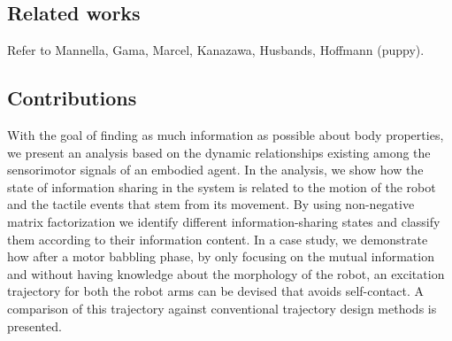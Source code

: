 
\subsection{Related works}

Refer to Mannella, Gama, Marcel, Kanazawa, Husbands, Hoffmann (puppy).

\subsection{Contributions}
With the goal of finding as much information as possible about body properties, we present an analysis based on the dynamic relationships existing among the sensorimotor signals of an embodied agent. In the analysis, we show how the state of information sharing in the system is related to the motion of the robot and the tactile events that stem from its movement. By using non-negative matrix factorization we identify different information-sharing states and classify them according to their information content. In a case study, we demonstrate how after a motor babbling phase, by only focusing on the mutual information and without having knowledge about the morphology of the robot, an excitation trajectory for both the robot arms can be devised that avoids self-contact. A comparison of this trajectory against conventional trajectory design methods is presented.


